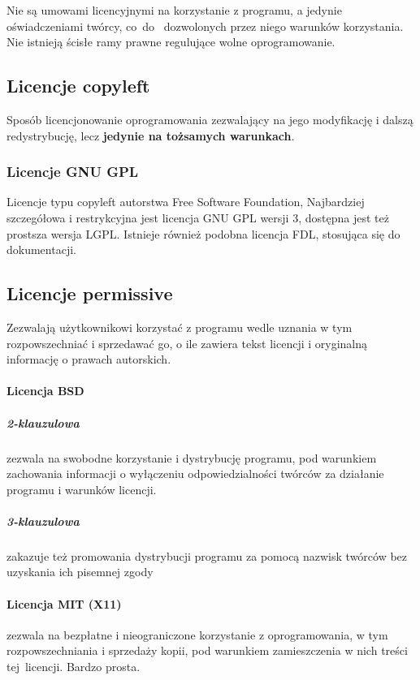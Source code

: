 \documentclass{article}
\begin{document}
Nie są umowami licencyjnymi na korzystanie z programu, a jedynie oświadczeniami twórcy, co~do~ dozwolonych przez niego warunków korzystania. Nie istnieją ścisłe ramy prawne regulujące wolne oprogramowanie.

\subsection{Licencje copyleft}

Sposób licencjonowanie oprogramowania zezwalający na jego modyfikację i dalszą redystrybucję, lecz \textbf{jedynie na tożsamych warunkach}.

\subsubsection{Licencje GNU GPL}

Licencje typu copyleft autorstwa Free Software Foundation, Najbardziej szczegółowa i restrykcyjna jest licencja GNU GPL wersji 3, dostępna jest też prostsza wersja LGPL.
Istnieje również podobna licencja FDL, stosująca się do dokumentacji.

\subsection{Licencje permissive}

Zezwalają użytkownikowi korzystać z programu wedle uznania w tym rozpowszechniać i sprzedawać go, o ile zawiera tekst licencji i oryginalną informację o prawach autorskich.

\paragraph{Licencja BSD}

\subparagraph{2-klauzulowa}

zezwala na swobodne korzystanie i dystrybucję programu, pod warunkiem zachowania informacji o wyłączeniu odpowiedzialności twórców za działanie programu i warunków licencji.

\subparagraph{3-klauzulowa}

zakazuje też promowania dystrybucji programu za pomocą nazwisk twórców bez uzyskania ich pisemnej zgody

\paragraph{Licencja MIT (X11)}

zezwala na bezpłatne i nieograniczone korzystanie z oprogramowania, w tym rozpowszechniania i sprzedaży kopii, pod warunkiem zamieszczenia w nich treści tej~licencji. Bardzo prosta.
\end{document}
